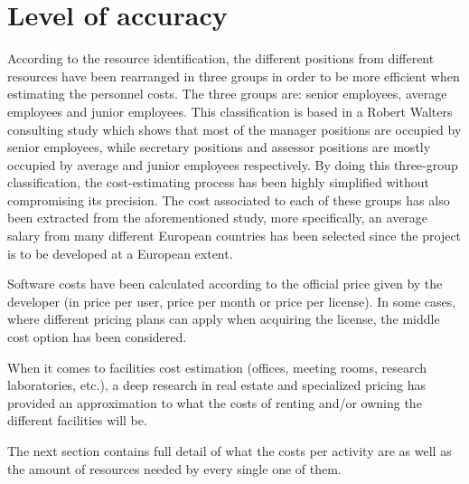 \section{Level of accuracy}

According to the resource identification, the different positions from different resources have been rearranged in three groups in order to be more efficient when estimating the personnel costs. The three groups are: senior employees, average employees and junior employees. This classification is based in a Robert Walters consulting study \cite{} which shows that most of the manager positions are occupied by senior employees, while secretary positions and assessor positions are mostly occupied by average and junior employees respectively. By doing this three-group classification, the cost-estimating process has been highly simplified without compromising its precision. The cost associated to each of these groups has also been extracted from the aforementioned study, more specifically, an average salary from many different European countries has been selected since the project is to be developed at a European extent.

Software costs have been calculated according to the official price given by the developer (in price per user, price per month or price per license). In some cases, where different pricing plans can apply when acquiring the license, the middle cost option has been considered.   

When it comes to facilities cost estimation (offices, meeting rooms, research laboratories, etc.), a deep research in real estate and specialized pricing has provided an approximation to what the costs of renting and/or owning the different facilities will be.

The next section contains full detail of what the costs per activity are as well as the amount of resources needed by every single one of them. 
